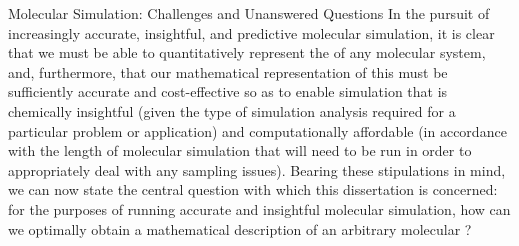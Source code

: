 \begin{section}{Molecular Simulation: Challenges and Unanswered Questions}
In the pursuit of increasingly accurate, insightful, and predictive molecular
simulation, it is clear that we must be able to quantitatively represent the
\pes of any molecular system, and, furthermore, that our mathematical
representation of this \pes must be sufficiently accurate and cost-effective so
as to enable simulation that is chemically insightful (given the type of
simulation analysis required for a particular problem or application) and
computationally affordable (in accordance with the length of molecular simulation that will
need to be run in order to appropriately deal with any sampling issues). 
Bearing these stipulations in mind, we can now state the central
question with which this dissertation is concerned: for the purposes of running
accurate and insightful molecular simulation, how can we optimally
obtain a mathematical description of an arbitrary molecular \pes?

\end{section}
